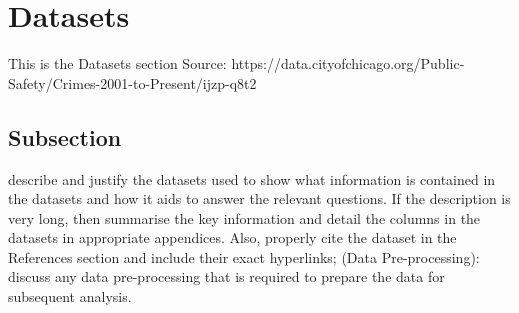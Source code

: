\section{Datasets}\label{Section label}
This is the Datasets section
\newline
Source: https://data.cityofchicago.org/Public-Safety/Crimes-2001-to-Present/ijzp-q8t2

\subsection{Subsection}\label{subsection}
describe and justify the datasets used to show what information is contained in the datasets and how it aids to answer the relevant questions. If the description is very long, then summarise the key information and detail the columns in the datasets in appropriate appendices. Also, properly cite the dataset in the References section and include their exact hyperlinks; \newline
(Data Pre-processing): discuss any data pre-processing that is required to prepare the data for subsequent analysis. 

